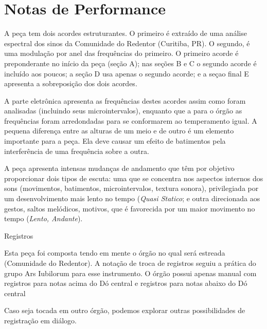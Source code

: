 
\section{Notas de Performance}

A peça tem dois acordes estruturantes. O primeiro é extraído de uma análise espectral dos sinos da Comunidade do Redentor (Curitiba, PR). O segundo, é uma modulação por anel das frequências do primeiro. O primeiro acorde é preponderante no início da peça (seção A); nas seções B e C o segundo acorde é incluído aos poucos; a seção D usa apenas o segundo acorde; e a seçao final E apresenta a sobreposição dos dois acordes.

A parte eletrônica apresenta as frequências destes acordes assim como foram analisadas (incluindo seus microintervalos), enquanto que a para o órgão as frequências foram arredondadas para se conformarem ao temperamento igual. A  pequena diferença entre as alturas de um meio e de outro é  um elemento importante para a peça. Ela deve causar um efeito de batimentos pela interferência de uma frequência sobre a outra. 

A peça apresenta intensas mudanças de andamento que têm por objetivo proporcionar dois tipos de escuta: uma que se concentra nos aspectos internos dos sons (movimentos, batimentos, microintervalos, textura sonora), privilegiada por um desenvolvimento mais lento no tempo (\textit{Quasi Statico}; e outra direcionada aos gestos, saltos melódicos, motivos, que é favorecida por um maior movimento no tempo (\textit{Lento, Andante}).


Registros

Esta peça foi composta tendo em mente o órgão no qual será estreada (Comunidade do Redentor). A notação de troca de registros seguiu a prática do grupo Ars Iubilorum para esse instrumento. O órgão possui apenas manual com registros para notas acima do Dó central e registros para notas abaixo do Dó central


Caso seja tocada em outro órgão, podemos explorar outras possibilidades de registração em diálogo.

